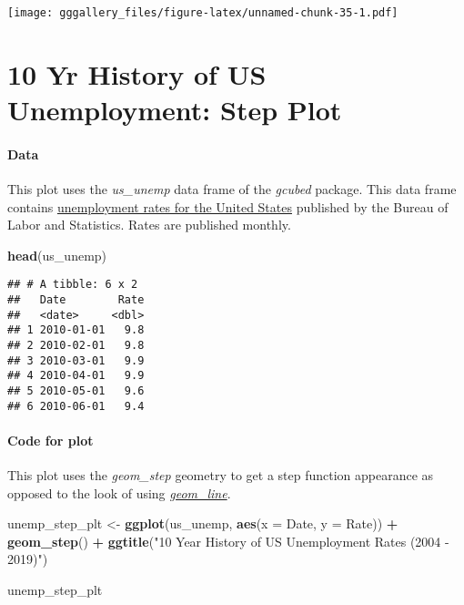 \documentclass[]{book}
\newenvironment{Shaded}{\begin{snugshade}}{\end{snugshade}}
\newcommand{\DataTypeTok}[1]{\textcolor[rgb]{0.13,0.29,0.53}{#1}}
\newcommand{\KeywordTok}[1]{\textcolor[rgb]{0.13,0.29,0.53}{\textbf{#1}}}
\newcommand{\NormalTok}[1]{#1}
\newcommand{\OperatorTok}[1]{\textcolor[rgb]{0.81,0.36,0.00}{\textbf{#1}}}
\newcommand{\StringTok}[1]{\textcolor[rgb]{0.31,0.60,0.02}{#1}}
\begin{document}
\texttt{[image: gggallery\_files/figure-latex/unnamed-chunk-35-1.pdf]}

\hypertarget{unempppp}{%
\chapter*{10 Yr History of US Unemployment: Step Plot}\label{unempppp}}

\hypertarget{unemppppdata}{%
\subsubsection*{Data}\label{unemppppdata}}

This plot uses the \emph{us\_unemp} data frame of the \emph{gcubed} package. This data frame contains \href{https://data.bls.gov/timeseries/LNS14000000}{unemployment rates for the United States} published by the Bureau of Labor and Statistics. Rates are published monthly.

\begin{Shaded}
\begin{Highlighting}[]
\KeywordTok{head}\NormalTok{(us_unemp)}
\end{Highlighting}
\end{Shaded}

\begin{verbatim}
## # A tibble: 6 x 2
##   Date        Rate
##   <date>     <dbl>
## 1 2010-01-01   9.8
## 2 2010-02-01   9.8
## 3 2010-03-01   9.9
## 4 2010-04-01   9.9
## 5 2010-05-01   9.6
## 6 2010-06-01   9.4
\end{verbatim}

\hypertarget{unemppppcode}{%
\subsubsection*{Code for plot}\label{unemppppcode}}

This plot uses the \emph{geom\_step} geometry to get a step function appearance as opposed to the look of using \protect\hyperlink{unemp1code}{\emph{geom\_line}}.

\begin{Shaded}
\begin{Highlighting}[]
\NormalTok{unemp_step_plt <-}\StringTok{ }\KeywordTok{ggplot}\NormalTok{(us_unemp, }\KeywordTok{aes}\NormalTok{(}\DataTypeTok{x =}\NormalTok{ Date, }\DataTypeTok{y =}\NormalTok{ Rate)) }\OperatorTok{+}\StringTok{ }\KeywordTok{geom_step}\NormalTok{() }\OperatorTok{+}\StringTok{ }
\StringTok{  }\KeywordTok{ggtitle}\NormalTok{(}\StringTok{"10 Year History of US Unemployment Rates (2004 - 2019)"}\NormalTok{)}
  
  
\NormalTok{unemp_step_plt}
\end{Highlighting}
\end{Shaded}
\end{document}

